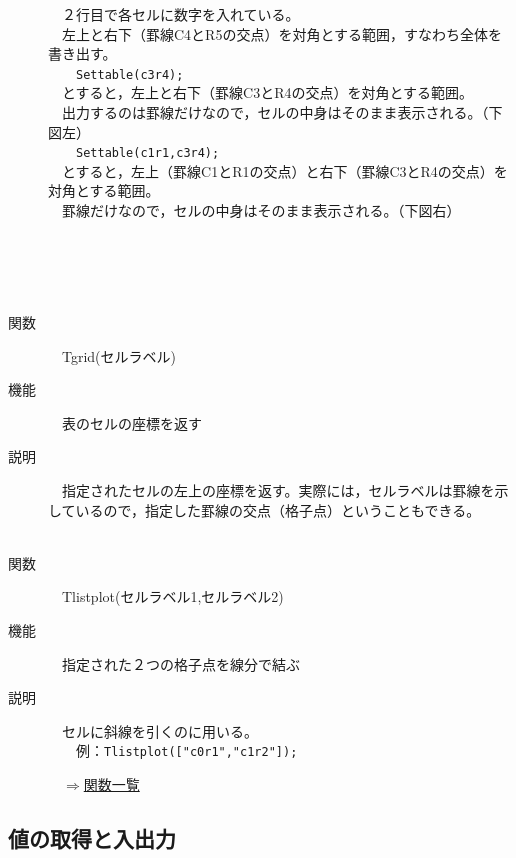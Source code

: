 \documentclass[papersize,a4paper,12pt,uplatex]{jsarticle}
\begin{document}
\begin{description}
　２行目で各セルに数字を入れている。\\
　左上と右下（罫線C4とR5の交点）を対角とする範囲，すなわち全体を書き出す。\\
　　\verb|Settable(c3r4);|\\
　とすると，左上と右下（罫線C3とR4の交点）を対角とする範囲。\\
　出力するのは罫線だけなので，セルの中身はそのまま表示される。（下図左）\\
　　\verb|Settable(c1r1,c3r4);|\\
　とすると，左上（罫線C1とR1の交点）と右下（罫線C3とR4の交点）を対角とする範囲。\\
　罫線だけなので，セルの中身はそのまま表示される。（下図右）\\
\\
　　　　　　　　　　\\
　\\
　\\
\hypertarget{tgrid}{}
\item[関数]　Tgrid(セルラベル)
\item[機能]　表のセルの座標を返す
\item[説明]　指定されたセルの左上の座標を返す。実際には，セルラベルは罫線を示しているので，指定した罫線の交点（格子点）ということもできる。\\
　\\
\hypertarget{tlistplot}{}
\item[関数]　Tlistplot(セルラベル1,セルラベル2)
\item[機能]　指定された２つの格子点を線分で結ぶ
\item[説明]　セルに斜線を引くのに用いる。\\
　　例：\verb|Tlistplot(["c0r1","c1r2"]);| 
　\\
\begin{flushright}　\hyperlink{functionlist}{$\Rightarrow$関数一覧}\end{flushright}

\end{description}

\newpage

\subsection{値の取得と入出力}
\end{document}
